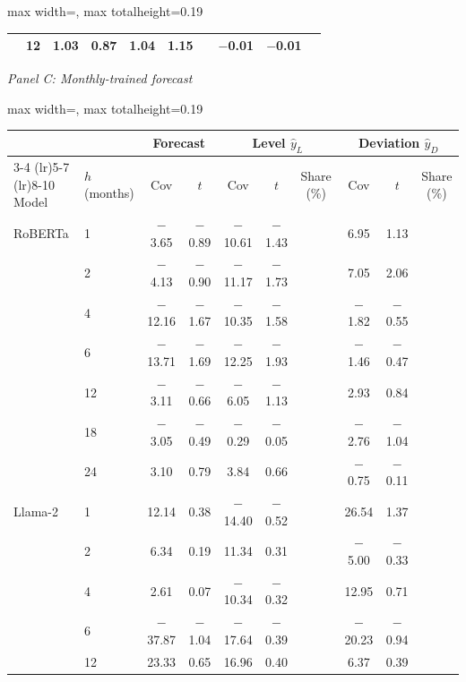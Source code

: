 \begin{table}[htbp]
{\begin{adjustbox}{max width=\linewidth, max totalheight=0.19\textheight}
\begin{tabular}{llcccccccc}
 & 12 & 1.03 & 0.87 & 1.04 & 1.15 &  & $-$0.01 & $-$0.01 &  \\
\bottomrule
\end{tabular}
\end{adjustbox}
\par\medskip
\textit{Panel C: Monthly-trained forecast}\\[2pt]
\begin{adjustbox}{max width=\linewidth, max totalheight=0.19\textheight}
\begin{tabular}{llcccccccc}
\toprule
\multicolumn{2}{c}{} & \multicolumn{2}{c}{Forecast} & \multicolumn{3}{c}{Level $\hat y_L$} & \multicolumn{3}{c}{Deviation $\hat y_D$} \\
\cmidrule(lr){3-4} \cmidrule(lr){5-7} \cmidrule(lr){8-10}
Model & $h$ (months) & Cov & $t$ & Cov & $t$ & Share (\%) & Cov & $t$ & Share (\%) \\
\midrule
RoBERTa & 1 & \phantom{0}$-$3.65 & $-$0.89 & $-$10.61 & $-$1.43 &  & \phantom{$-$0}6.95 & \phantom{$-$}1.13 &  \\
 & 2 & \phantom{0}$-$4.13 & $-$0.90 & $-$11.17 & $-$1.73 &  & \phantom{$-$0}7.05 & \phantom{$-$}2.06 &  \\
 & 4 & $-$12.16 & $-$1.67 & $-$10.35 & $-$1.58 &  & \phantom{0}$-$1.82 & $-$0.55 &  \\
 & 6 & $-$13.71 & $-$1.69 & $-$12.25 & $-$1.93 &  & \phantom{0}$-$1.46 & $-$0.47 &  \\
 & 12 & \phantom{0}$-$3.11 & $-$0.66 & \phantom{0}$-$6.05 & $-$1.13 &  & \phantom{$-$0}2.93 & \phantom{$-$}0.84 &  \\
 & 18 & \phantom{0}$-$3.05 & $-$0.49 & \phantom{0}$-$0.29 & $-$0.05 &  & \phantom{0}$-$2.76 & $-$1.04 &  \\
 & 24 & \phantom{$-$0}3.10 & \phantom{$-$}0.79 & \phantom{$-$0}3.84 & \phantom{$-$}0.66 &  & \phantom{0}$-$0.75 & $-$0.11 &  \\
\midrule
Llama-2 & 1 & \phantom{$-$}12.14 & \phantom{$-$}0.38 & $-$14.40 & $-$0.52 &  & \phantom{$-$}26.54 & \phantom{$-$}1.37 &  \\
 & 2 & \phantom{$-$0}6.34 & \phantom{$-$}0.19 & \phantom{$-$}11.34 & \phantom{$-$}0.31 &  & \phantom{0}$-$5.00 & $-$0.33 &  \\
 & 4 & \phantom{$-$0}2.61 & \phantom{$-$}0.07 & $-$10.34 & $-$0.32 &  & \phantom{$-$}12.95 & \phantom{$-$}0.71 &  \\
 & 6 & $-$37.87 & $-$1.04 & $-$17.64 & $-$0.39 &  & $-$20.23 & $-$0.94 &  \\
 & 12 & \phantom{$-$}23.33 & \phantom{$-$}0.65 & \phantom{$-$}16.96 & \phantom{$-$}0.40 &  & \phantom{$-$0}6.37 & \phantom{$-$}0.39 &  \\
\bottomrule
\end{tabular}
\end{adjustbox}
}
\end{table}
